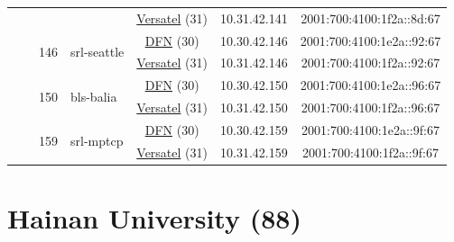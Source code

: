 \begin{small}
\begin{center}
\begin{longtable}{|c|c|c|c|c|c|c|c|}
  &  &  &  & \multicolumn{2}{|c|}{\tiny{\href{http://www.versatel.de}{Versatel} (31)}} & \tiny{10.31.42.141} & \tiny{2001:700:4100:1f2a::8d:67} \\* \cline{3-3}\cline{4-4}\cline{5-5}\cline{6-6}\cline{7-7}\cline{8-8}
  &  & \multirow{2}{*}{\tiny{146}} & \multicolumn{1}{|l|}{\multirow{2}{*}{\tiny{srl-seattle}}} & \multicolumn{2}{|c|}{\tiny{\href{https://www.dfn.de}{DFN} (30)}} & \tiny{10.30.42.146} & \tiny{2001:700:4100:1e2a::92:67} \\* \cline{5-5}\cline{6-6}\cline{7-7}\cline{8-8}
  &  &  &  & \multicolumn{2}{|c|}{\tiny{\href{http://www.versatel.de}{Versatel} (31)}} & \tiny{10.31.42.146} & \tiny{2001:700:4100:1f2a::92:67} \\* \cline{3-3}\cline{4-4}\cline{5-5}\cline{6-6}\cline{7-7}\cline{8-8}
  &  & \multirow{2}{*}{\tiny{150}} & \multicolumn{1}{|l|}{\multirow{2}{*}{\tiny{bls-balia}}} & \multicolumn{2}{|c|}{\tiny{\href{https://www.dfn.de}{DFN} (30)}} & \tiny{10.30.42.150} & \tiny{2001:700:4100:1e2a::96:67} \\* \cline{5-5}\cline{6-6}\cline{7-7}\cline{8-8}
  &  &  &  & \multicolumn{2}{|c|}{\tiny{\href{http://www.versatel.de}{Versatel} (31)}} & \tiny{10.31.42.150} & \tiny{2001:700:4100:1f2a::96:67} \\* \cline{3-3}\cline{4-4}\cline{5-5}\cline{6-6}\cline{7-7}\cline{8-8}
  &  & \multirow{2}{*}{\tiny{159}} & \multicolumn{1}{|l|}{\multirow{2}{*}{\tiny{srl-mptcp}}} & \multicolumn{2}{|c|}{\tiny{\href{https://www.dfn.de}{DFN} (30)}} & \tiny{10.30.42.159} & \tiny{2001:700:4100:1e2a::9f:67} \\* \cline{5-5}\cline{6-6}\cline{7-7}\cline{8-8}
  &  &  &  & \multicolumn{2}{|c|}{\tiny{\href{http://www.versatel.de}{Versatel} (31)}} & \tiny{10.31.42.159} & \tiny{2001:700:4100:1f2a::9f:67} \\ \hline
\end{longtable}
\end{center}
\end{small}



\section{Hainan University (88)}
\label{sec:HU}

